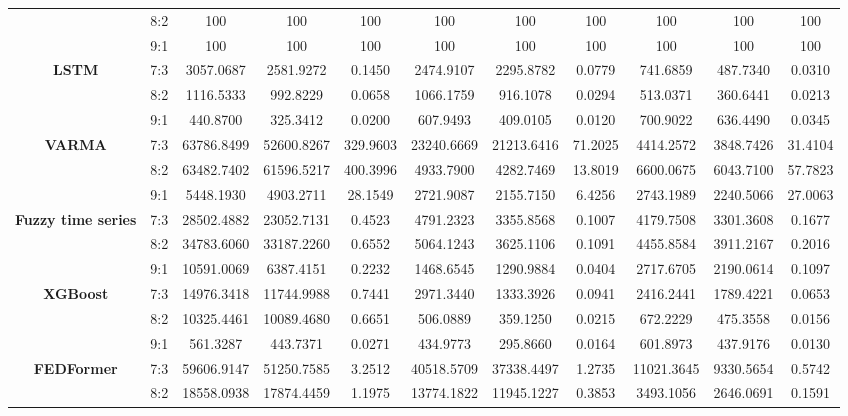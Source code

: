 \documentclass[conference]{IEEEtran}
\begin{document}
\begin{table}
\begin{tabular}{|c|c|c|c|c|c|c|c|c|c|c|}
            & 8:2 & 100 & 100 & 100 & 100 & 100 & 100 & 100 & 100 & 100 \\
            & 9:1 & 100 & 100 & 100 & 100 & 100 & 100 & 100 & 100 & 100 \\ \hline
        \multirow{3}{*}{\textbf{LSTM}} 
            & 7:3 & 3057.0687 & 2581.9272 & 0.1450 & 2474.9107 & 2295.8782 & 0.0779 & 741.6859 & 487.7340 & 0.0310 \\
            & 8:2 & 1116.5333 & 992.8229 & 0.0658 & 1066.1759 & 916.1078 & 0.0294 & 513.0371 & 360.6441 & 0.0213 \\
            & 9:1 & 440.8700 & 325.3412 & 0.0200 & 607.9493 & 409.0105 & 0.0120 & 700.9022 & 636.4490 & 0.0345 \\ \hline
        \multirow{3}{*}{\textbf{VARMA}} 
            & 7:3 & 63786.8499 & 52600.8267 & 329.9603 & 23240.6669 & 21213.6416 & 71.2025 & 4414.2572 & 3848.7426 & 31.4104 \\
            & 8:2 & 63482.7402 & 61596.5217 & 400.3996 & 4933.7900 & 4282.7469 & 13.8019 & 6600.0675 & 6043.7100 & 57.7823 \\
            & 9:1 & 5448.1930 & 4903.2711 & 28.1549 & 2721.9087 & 2155.7150 & 6.4256 & 2743.1989 & 2240.5066 & 27.0063 \\ \hline
        \multirow{3}{*}{\textbf{Fuzzy time series}} 
            & 7:3 & 28502.4882 & 23052.7131 & 0.4523 & 4791.2323 & 3355.8568 & 0.1007 & 4179.7508 & 3301.3608 & 0.1677 \\
            & 8:2 & 34783.6060 & 33187.2260 & 0.6552 & 5064.1243 & 3625.1106 & 0.1091 & 4455.8584 & 3911.2167 & 0.2016 \\
            & 9:1 & 10591.0069 & 6387.4151 & 0.2232 & 1468.6545 & 1290.9884 &  0.0404 & 2717.6705 & 2190.0614 & 0.1097 \\ \hline
        \multirow{3}{*}{\textbf{XGBoost}} 
            & 7:3 & 14976.3418 & 11744.9988 & 0.7441 & 2971.3440 & 1333.3926 & 0.0941 & 2416.2441 & 1789.4221 & 0.0653 \\
            & 8:2 & 10325.4461 & 10089.4680 & 0.6651 & 506.0889 & 359.1250 & 0.0215 & 672.2229 & 475.3558 & 0.0156 \\
            & 9:1 & 561.3287 & 443.7371 & 0.0271 & 434.9773 & 295.8660 & 0.0164 & 601.8973 & 437.9176 & 0.0130 \\ \hline
        \multirow{3}{*}{\textbf{FEDFormer}} 
            & 7:3 & 59606.9147 & 51250.7585 & 3.2512 & 40518.5709 & 37338.4497 & 1.2735 & 11021.3645 & 9330.5654 & 0.5742 \\
            & 8:2 & 18558.0938 & 17874.4459 & 1.1975 &  13774.1822 & 11945.1227 & 0.3853 & 3493.1056 & 2646.0691 &  0.1591 \\

\end{tabular}
\end{table}
\end{document}
